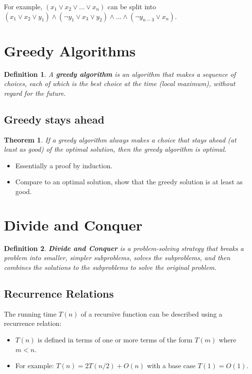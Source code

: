 \documentclass[11pt,fleqn]{article}
\newtheorem*{theorem}{Theorem}
\newtheorem*{definition}{Definition}
\begin{document}
For example, $(x_1 \lor x_2 \lor \ldots \lor x_n)$ can be split into $(x_1 \lor x_2 \lor y_1) \land (\neg y_1 \lor x_3 \lor y_2) \land \ldots \land (\neg y_{n-3} \lor x_n)$.

\section{Greedy Algorithms}

\begin{definition}
    A \textbf{greedy algorithm} is an algorithm that makes a sequence of choices, each of which is the best choice at the time (local maximum), without regard for the future.
\end{definition}
\subsection{Greedy stays ahead}
\begin{theorem}
    If a greedy algorithm always makes a choice that stays ahead (at least as good) of the optimal solution, then the greedy algorithm is optimal.
\end{theorem}
\begin{itemize}
    \item Essentially a proof by induction.
    \item Compare to an optimal solution, show that the greedy solution is at least as good.
\end{itemize}

\section{Divide and Conquer}

\begin{definition}
    \textbf{Divide and Conquer} is a problem-solving strategy that breaks a problem into smaller, simpler subproblems, solves the subproblems, and then combines the solutions to the subproblems to solve the original problem.
\end{definition}

\subsection{Recurrence Relations}
The running time $T(n)$ of a recursive function can be described using a recurrence relation:\begin{itemize}
    \item $T(n)$ is defined in terms of one or more terms of the form $T(m)$ where $m < n$.
    \item For example: $T(n) = 2T(n/2) + O(n)$ with a base case $T(1) = O(1)$.
\end{itemize}
\end{document}
